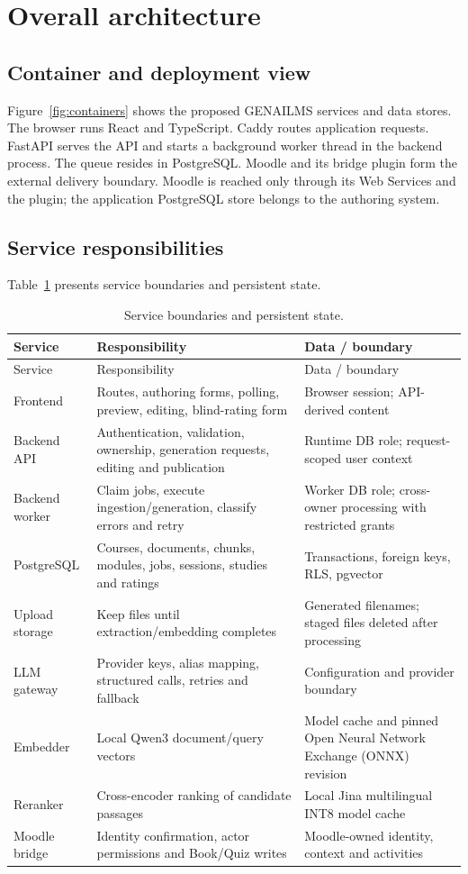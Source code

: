 \clearpage\section{Overall architecture}\label{sec:architecture}
\subsection{Container and deployment view}
Figure~\ref{fig:containers} shows the proposed GENAILMS services and data stores. The browser runs React and TypeScript. Caddy routes application requests. FastAPI serves the API and starts a background worker thread in the backend process. The queue resides in PostgreSQL. Moodle and its bridge plugin form the external delivery boundary. Moodle is reached only through its Web Services and the  plugin; the application PostgreSQL store belongs to the authoring system.
\subsection{Service responsibilities}
\par
Table~\ref{tab:04-architecture-1} presents service boundaries and persistent state.
\begin{longtable}{|p{2.7cm}|p{6.0cm}|p{5.2cm}|}\caption{Service boundaries and persistent state.}\label{tab:04-architecture-1}\\\hline
Service & Responsibility & Data / boundary\\\hline\endfirsthead
\hline Service & Responsibility & Data / boundary\\\hline\endhead
Frontend & Routes, authoring forms, polling, preview, editing, blind-rating form & Browser session; API-derived content\\\hline
Backend API & Authentication, validation, ownership, generation requests, editing and publication & Runtime DB role; request-scoped user context\\\hline
Backend worker & Claim jobs, execute ingestion/generation, classify errors and retry & Worker DB role; cross-owner processing with restricted grants\\\hline
PostgreSQL & Courses, documents, chunks, modules, jobs, sessions, studies and ratings & Transactions, foreign keys, RLS, pgvector\\\hline
Upload storage & Keep files until extraction/embedding completes & Generated filenames; staged files deleted after processing\\\hline
LLM gateway & Provider keys, alias mapping, structured calls, retries and fallback & Configuration and provider boundary\\\hline
Embedder & Local Qwen3 document/query vectors & Model cache and pinned Open Neural Network Exchange (ONNX) revision\\\hline
Reranker & Cross-encoder ranking of candidate passages & Local Jina multilingual INT8 model cache\\\hline
Moodle bridge & Identity confirmation, actor permissions and Book/Quiz writes & Moodle-owned identity, context and activities\\\hline\end{longtable}
